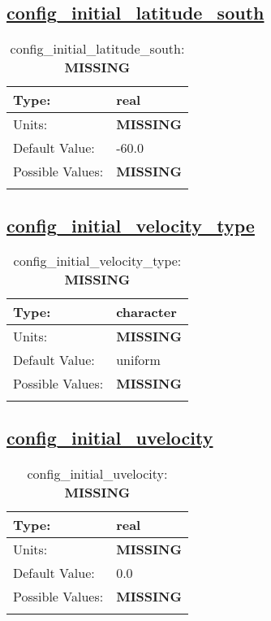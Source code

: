 \subsection[config\_initial\_latitude\_south]{\hyperref[sec:nm_tab_initialize]{config\_initial\_latitude\_south}}
\label{subsec:nm_sec_config_initial_latitude_south}
\begin{center}
\begin{longtable}{| p{2.0in} || p{4.0in} |}
    \hline
    Type: & real \\
    \hline
    Units: & {\bf \color{red} MISSING} \\
    \hline
    Default Value: & -60.0 \\
    \hline
    Possible Values: & {\bf \color{red} MISSING} \\
    \hline
    \caption{config\_initial\_latitude\_south: {\bf \color{red} MISSING}}
\end{longtable}
\end{center}
\subsection[config\_initial\_velocity\_type]{\hyperref[sec:nm_tab_initialize]{config\_initial\_velocity\_type}}
\label{subsec:nm_sec_config_initial_velocity_type}
\begin{center}
\begin{longtable}{| p{2.0in} || p{4.0in} |}
    \hline
    Type: & character \\
    \hline
    Units: & {\bf \color{red} MISSING} \\
    \hline
    Default Value: & uniform \\
    \hline
    Possible Values: & {\bf \color{red} MISSING} \\
    \hline
    \caption{config\_initial\_velocity\_type: {\bf \color{red} MISSING}}
\end{longtable}
\end{center}
\subsection[config\_initial\_uvelocity]{\hyperref[sec:nm_tab_initialize]{config\_initial\_uvelocity}}
\label{subsec:nm_sec_config_initial_uvelocity}
\begin{center}
\begin{longtable}{| p{2.0in} || p{4.0in} |}
    \hline
    Type: & real \\
    \hline
    Units: & {\bf \color{red} MISSING} \\
    \hline
    Default Value: & 0.0 \\
    \hline
    Possible Values: & {\bf \color{red} MISSING} \\
    \hline
    \caption{config\_initial\_uvelocity: {\bf \color{red} MISSING}}
\end{longtable}
\end{center}
